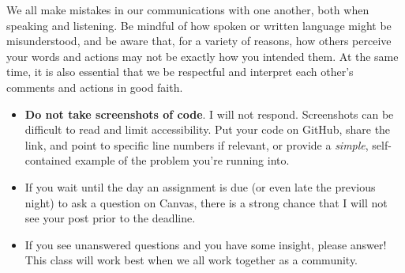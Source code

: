 \documentclass[
  11pt,
]{article}
\providecommand{\tightlist}{%
  \setlength{\itemsep}{0pt}\setlength{\parskip}{0pt}}\usepackage{longtable,booktabs,array}
\begin{document}
\begin{tcolorbox}[enhanced jigsaw, opacitybacktitle=0.6, colbacktitle=quarto-callout-important-color!10!white, title=\textcolor{quarto-callout-important-color}{\faExclamation}\hspace{0.5em}{Please, Be Excellent To Teach Other}, coltitle=black, opacityback=0, rightrule=.15mm, titlerule=0mm, colback=white, colframe=quarto-callout-important-color-frame, toprule=.15mm, breakable, arc=.35mm, bottomtitle=1mm, leftrule=.75mm, left=2mm, bottomrule=.15mm, toptitle=1mm]

We all make mistakes in our communications with one another, both when
speaking and listening. Be mindful of how spoken or written language
might be misunderstood, and be aware that, for a variety of reasons, how
others perceive your words and actions may not be exactly how you
intended them. At the same time, it is also essential that we be
respectful and interpret each other's comments and actions in good
faith.

\end{tcolorbox}

\begin{tcolorbox}[enhanced jigsaw, opacitybacktitle=0.6, colbacktitle=quarto-callout-important-color!10!white, title=\textcolor{quarto-callout-important-color}{\faExclamation}\hspace{0.5em}{Troubleshooting Tips}, coltitle=black, opacityback=0, rightrule=.15mm, titlerule=0mm, colback=white, colframe=quarto-callout-important-color-frame, toprule=.15mm, breakable, arc=.35mm, bottomtitle=1mm, leftrule=.75mm, left=2mm, bottomrule=.15mm, toptitle=1mm]

\begin{itemize}
\tightlist
\item
  \textbf{Do not take screenshots of code}. I will not respond.
  Screenshots can be difficult to read and limit accessibility. Put your
  code on GitHub, share the link, and point to specific line numbers if
  relevant, or provide a \emph{simple}, self-contained example of the
  problem you're running into.
\item
  If you wait until the day an assignment is due (or even late the
  previous night) to ask a question on Canvas, there is a strong chance
  that I will not see your post prior to the deadline.
\item
  If you see unanswered questions and you have some insight, please
  answer! This class will work best when we all work together as a
  community.
\end{itemize}

\end{tcolorbox}
\end{document}

